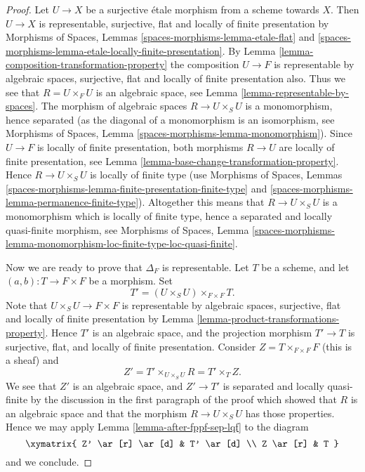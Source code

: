 \begin{proof}
Let $U \to X$ be a surjective \'etale morphism from a scheme towards $X$.
Then $U \to X$ is representable, surjective, flat and
locally of finite presentation by
Morphisms of Spaces,
Lemmas \ref{spaces-morphisms-lemma-etale-flat} and
\ref{spaces-morphisms-lemma-etale-locally-finite-presentation}.
By
Lemma \ref{lemma-composition-transformation-property}
the composition $U \to F$ is representable by algebraic spaces,
surjective, flat and locally of finite presentation also.
Thus we see that $R = U \times_F U$ is an algebraic space, see
Lemma \ref{lemma-representable-by-spaces}.
The morphism of algebraic spaces $R \to U \times_S U$ is
a monomorphism, hence separated (as the diagonal of a monomorphism
is an isomorphism, see
Morphisms of Spaces,
Lemma \ref{spaces-morphisms-lemma-monomorphism}).
Since $U \to F$ is locally of finite presentation, both
morphisms $R \to U$ are locally of finite presentation, see
Lemma \ref{lemma-base-change-transformation-property}.
Hence $R \to U \times_S U$ is locally of finite type (use
Morphisms of Spaces,
Lemmas \ref{spaces-morphisms-lemma-finite-presentation-finite-type} and
\ref{spaces-morphisms-lemma-permanence-finite-type}).
Altogether this means that
$R \to U \times_S U$ is a monomorphism which is locally of finite
type, hence a separated and locally quasi-finite morphism, see
Morphisms of Spaces, Lemma
\ref{spaces-morphisms-lemma-monomorphism-loc-finite-type-loc-quasi-finite}.

\medskip\noindent
Now we are ready to prove that $\Delta_F$ is representable.
Let $T$ be a scheme, and let $(a, b) : T \to F \times F$ be a morphism.
Set
$$
T' = (U \times_S U) \times_{F \times F} T.
$$
Note that $U \times_S U \to F \times F$ is
representable by algebraic spaces, surjective, flat and
locally of finite presentation by
Lemma \ref{lemma-product-transformations-property}.
Hence $T'$ is an algebraic space, and the projection morphism
$T' \to T$ is surjective, flat, and locally of finite presentation.
Consider $Z = T \times_{F \times F} F$ (this is a sheaf) and
$$
Z' = T' \times_{U \times_S U} R
= T' \times_T Z.
$$
We see that $Z'$ is an algebraic space, and
$Z' \to T'$ is separated and locally quasi-finite by the
discussion in the first paragraph of the proof which showed that $R$ is
an algebraic space and that the
morphism $R \to U \times_S U$ has those properties.
Hence we may apply
Lemma \ref{lemma-after-fppf-sep-lqf}
to the diagram
$$
\xymatrix{
Z' \ar[r] \ar[d] & T' \ar[d] \\
Z \ar[r] & T
}
$$
and we conclude.
\end{proof}

